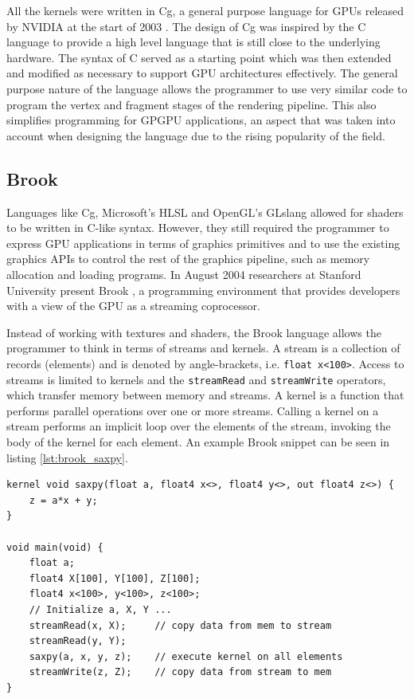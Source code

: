 All the kernels were written in Cg, a general purpose language for GPUs released by NVIDIA at the start of 2003 \cite{nvidia_cg}. The design of Cg was inspired by the C language to provide a high level language that is still close to the underlying hardware. The syntax of C served as a starting point which was then extended and modified as necessary to support GPU architectures effectively. The general purpose nature of the language allows the programmer to use very similar code to program the vertex and fragment stages of the rendering pipeline. This also simplifies programming for GPGPU applications, an aspect that was taken into account when designing the language due to the rising popularity of the field.

\subsection{Brook}
Languages like Cg, Microsoft's HLSL and OpenGL's GLslang allowed for shaders to be written in C-like syntax. However, they still required the programmer to express GPU applications in terms of graphics primitives and to use the existing graphics APIs to control the rest of the graphics pipeline, such as memory allocation and loading programs. In August 2004 researchers at Stanford University present Brook \cite{brook}, a programming environment that provides developers with a view of the GPU as a streaming coprocessor.

Instead of working with textures and shaders, the Brook language allows the programmer to think in terms of streams and kernels. A stream is a collection of records (elements) and is denoted by angle-brackets, i.e. \texttt{float x<100>}. Access to streams is limited to kernels and the \texttt{streamRead} and \texttt{streamWrite} operators, which transfer memory between memory and streams. A kernel is a function that performs parallel operations over one or more streams. Calling a kernel on a stream performs an implicit loop over the elements of the stream, invoking the body of the kernel for each element. An example Brook snippet can be seen in listing \ref{lst:brook_saxpy}.

\begin{lstlisting}[style=BrookStyle, caption=Brook saxpy example, float, floatplacement=H, label={lst:brook_saxpy}]
kernel void saxpy(float a, float4 x<>, float4 y<>, out float4 z<>) {
    z = a*x + y;
}

void main(void) {
    float a;
    float4 X[100], Y[100], Z[100];
    float4 x<100>, y<100>, z<100>;
    // Initialize a, X, Y ...
    streamRead(x, X);     // copy data from mem to stream
    streamRead(y, Y);
    saxpy(a, x, y, z);    // execute kernel on all elements
    streamWrite(z, Z);    // copy data from stream to mem
}   
\end{lstlisting}


